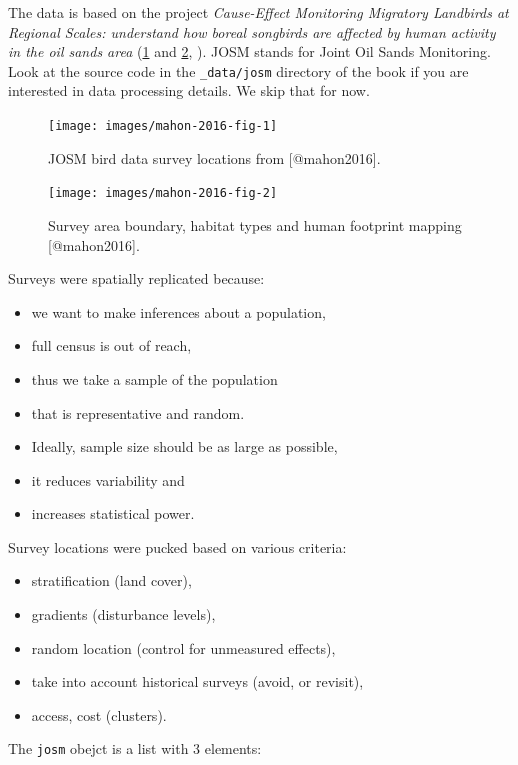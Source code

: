 \documentclass[12pt,]{book}
\providecommand{\tightlist}{%
  \setlength{\itemsep}{0pt}\setlength{\parskip}{0pt}}
\begin{document}
The data is based on the project \emph{Cause-Effect Monitoring Migratory Landbirds at Regional Scales:
understand how boreal songbirds are affected by human activity in the oil sands area} (\ref{fig:data-1} and \ref{fig:data-2}, \citep{mahon2016}).
JOSM stands for Joint Oil Sands Monitoring.
Look at the source code in the \texttt{\_data/josm} directory of the book
if you are interested in data processing details.
We skip that for now.

\begin{figure}
\texttt{[image: images/mahon-2016-fig-1]} \caption{JOSM bird data survey locations from [@mahon2016].}\label{fig:data-1}
\end{figure}

\begin{figure}
\texttt{[image: images/mahon-2016-fig-2]} \caption{Survey area boundary, habitat types and human footprint mapping [@mahon2016].}\label{fig:data-2}
\end{figure}

Surveys were spatially replicated because:

\begin{itemize}
\tightlist
\item
  we want to make inferences about a population,
\item
  full census is out of reach,
\item
  thus we take a sample of the population
\item
  that is representative and random.
\item
  Ideally, sample size should be as large as possible,
\item
  it reduces variability and
\item
  increases statistical power.
\end{itemize}

Survey locations were pucked based on various criteria:

\begin{itemize}
\tightlist
\item
  stratification (land cover),
\item
  gradients (disturbance levels),
\item
  random location (control for unmeasured effects),
\item
  take into account historical surveys (avoid, or revisit),
\item
  access, cost (clusters).
\end{itemize}

The \texttt{josm} obejct is a list with 3 elements:
\end{document}
